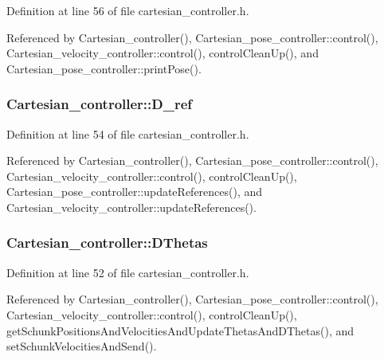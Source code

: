 Definition at line 56 of file cartesian\-\_\-controller.\-h.



Referenced by Cartesian\-\_\-controller(), Cartesian\-\_\-pose\-\_\-controller\-::control(), Cartesian\-\_\-velocity\-\_\-controller\-::control(), control\-Clean\-Up(), and Cartesian\-\_\-pose\-\_\-controller\-::print\-Pose().

\hypertarget{classCartesian__controller_abb248cb3215a574fe8e1bb8fb0b8626d}{
\subsubsection[{D\-\_\-ref}]{ Cartesian\-\_\-controller\-::\-D\-\_\-ref\hspace{0.3cm}{\ttfamily [protected]}}}\label{classCartesian__controller_abb248cb3215a574fe8e1bb8fb0b8626d}


Definition at line 54 of file cartesian\-\_\-controller.\-h.



Referenced by Cartesian\-\_\-controller(), Cartesian\-\_\-pose\-\_\-controller\-::control(), Cartesian\-\_\-velocity\-\_\-controller\-::control(), control\-Clean\-Up(), Cartesian\-\_\-pose\-\_\-controller\-::update\-References(), and Cartesian\-\_\-velocity\-\_\-controller\-::update\-References().

\hypertarget{classCartesian__controller_a5d6419e62e130150edfcbd82b1dadcae}{
\subsubsection[{D\-Thetas}]{ Cartesian\-\_\-controller\-::\-D\-Thetas\hspace{0.3cm}{\ttfamily [protected]}}}\label{classCartesian__controller_a5d6419e62e130150edfcbd82b1dadcae}


Definition at line 52 of file cartesian\-\_\-controller.\-h.



Referenced by Cartesian\-\_\-controller(), Cartesian\-\_\-pose\-\_\-controller\-::control(), Cartesian\-\_\-velocity\-\_\-controller\-::control(), control\-Clean\-Up(), get\-Schunk\-Positions\-And\-Velocities\-And\-Update\-Thetas\-And\-D\-Thetas(), and set\-Schunk\-Velocities\-And\-Send().

